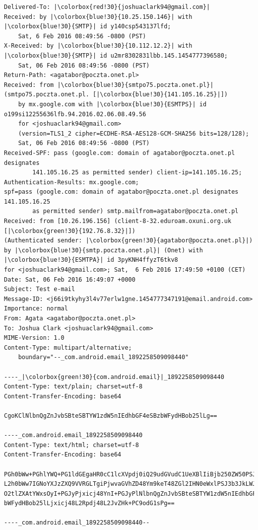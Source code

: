 \begin{lstlisting}
Delivered-To: |\colorbox{red!30}{joshuaclark94@gmail.com}|
Received: by |\colorbox{blue!30}{10.25.150.146}| with |\colorbox{blue!30}{SMTP}| id y140csp543137lfd;
	Sat, 6 Feb 2016 08:49:56 -0800 (PST)
X-Received: by |\colorbox{blue!30}{10.112.12.2}| with |\colorbox{blue!30}{SMTP}| id u2mr8302831lbb.145.1454777396580;
	Sat, 06 Feb 2016 08:49:56 -0800 (PST)
Return-Path: <agatabor@poczta.onet.pl>
Received: from |\colorbox{blue!30}{smtpo75.poczta.onet.pl}| (smtpo75.poczta.onet.pl. [|\colorbox{blue!30}{141.105.16.25}|])
	by mx.google.com with |\colorbox{blue!30}{ESMTPS}| id o199si12255636lfb.94.2016.02.06.08.49.56
	for <joshuaclark94@gmail.com>
	(version=TLS1_2 cipher=ECDHE-RSA-AES128-GCM-SHA256 bits=128/128);
	Sat, 06 Feb 2016 08:49:56 -0800 (PST)
Received-SPF: pass (google.com: domain of agatabor@poczta.onet.pl designates
		141.105.16.25 as permitted sender) client-ip=141.105.16.25;
Authentication-Results: mx.google.com;
spf=pass (google.com: domain of agatabor@poczta.onet.pl designates 141.105.16.25
		as permitted sender) smtp.mailfrom=agatabor@poczta.onet.pl
Received: from [10.26.196.156] (client-8-32.eduroam.oxuni.org.uk [|\colorbox{green!30}{192.76.8.32}|])
(Authenticated sender: |\colorbox{green!30}{agatabor@poczta.onet.pl}|)
by |\colorbox{blue!30}{smtp.poczta.onet.pl}| (Onet) with |\colorbox{blue!30}{ESMTPA}| id 3pyKNH4ffyzT6tkv8
for <joshuaclark94@gmail.com>; Sat,  6 Feb 2016 17:49:50 +0100 (CET)
Date: Sat, 06 Feb 2016 16:49:07 +0000
Subject: Test e-mail
Message-ID: <j66i9tkyhy3l4v77erlw1gne.1454777347191@email.android.com>
Importance: normal
From: Agata <agatabor@poczta.onet.pl>
To: Joshua Clark <joshuaclark94@gmail.com>
MIME-Version: 1.0
Content-Type: multipart/alternative;
	boundary="--_com.android.email_1892258509098440"

----_|\colorbox{green!30}{com.android.email}|_1892258509098440
Content-Type: text/plain; charset=utf-8
Content-Transfer-Encoding: base64

CgoKClNlbnQgZnJvbSBteSBTYW1zdW5nIEdhbGF4eSBzbWFydHBob25lLg==

----_com.android.email_1892258509098440
Content-Type: text/html; charset=utf-8
Content-Transfer-Encoding: base64

PGh0bWw+PGhlYWQ+PG1ldGEgaHR0cC1lcXVpdj0iQ29udGVudC1UeXBlIiBjb250ZW50PSJ0ZXh0
L2h0bWw7IGNoYXJzZXQ9VVRGLTgiPjwvaGVhZD48Ym9keT48ZGl2IHN0eWxlPSJ3b3JkLWJyZWFr
O2tlZXAtYWxsOyI+PGJyPjxicj48YnI+PGJyPlNlbnQgZnJvbSBteSBTYW1zdW5nIEdhbGF4eSBz
bWFydHBob25lLjxicj48L2Rpdj48L2JvZHk+PC9odG1sPg==

----_com.android.email_1892258509098440--
\end{lstlisting}

